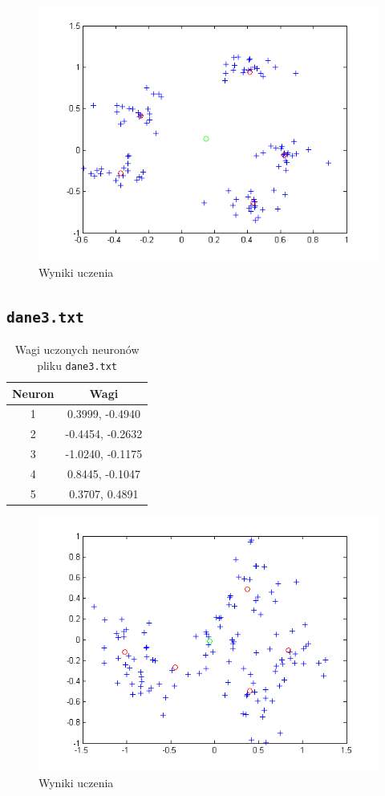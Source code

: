 \documentclass[pointlessnumbers, abstracton, headsepline, a4paper]{scrartcl}
\begin{document}
\begin{figure}[!h]
\centering
\includegraphics[scale=0.8]{src/dane2.png}\caption{\label{fig:dane1}Wyniki uczenia}
\end{figure}

\clearpage
\subsection{\texttt{dane3.txt}}

\begin{table}[h]
\centering
\begin{tabular}[t]{c|c}
Neuron & Wagi \\
\hline
1&  0.3999,  -0.4940 \\
2& -0.4454,  -0.2632 \\
3& -1.0240,  -0.1175 \\
4&  0.8445,  -0.1047 \\
5&  0.3707,   0.4891 \\
\end{tabular}
\caption{\label{tab:xor}Wagi uczonych neuronów pliku \texttt{dane3.txt}}
\end{table}

\begin{figure}[!h]
\centering
\includegraphics[scale=0.8]{src/dane3.png}\caption{\label{fig:dane1}Wyniki uczenia}
\end{figure}
\end{document}
